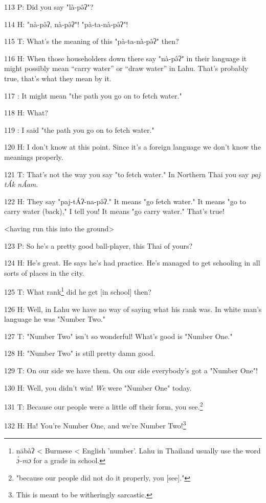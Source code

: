 113 P: Did you say "là-pə̂ʔ"?

114 H: "nà-pə̂ʔ, nà-pə̂ʔ"! "pà-ta-nà-pə̂ʔ"!

115 T: What's the meaning of this "pà-ta-nà-pə̂ʔ" then?

116 H: When those householders down there say "nà-pə̂ʔ" in
their language it might possibly mean ``carry water'' or ``draw water'' in Lahu.
That's probably true, that's what they mean by it.

117    : It might mean "the path you go on to fetch water."

118 H: What?

119    : I said "the path you go on to fetch water."

120 H: I don't know at this point. Since it's a foreign language we don't know
the meanings properly.

121 T: That's not the way you say "to fetch water." In Northern
Thai you say \textit{paj tÁk nÁam}.

122 H: They say "paj-tÁʔ-na-pə̂ʔ." It means "go
fetch water." It means "go to carry water (back)," I
tell you! It means "go carry water." That's true!

<having run this into the ground>

123 P: So he's a pretty good ball-player, this Thai of yours?

124 H: He's great. He says he's had practice. He's managed to get schooling in
all sorts of places in the city.

125 T: What rank\footnote{nābàʔ < Burmese < English 'number'. Lahu in Thailand usually use the word \textit{ɔ̀-mɔ} for a grade in school.} did he get [in school] then?

126 H: Well, in Lahu we have no way of saying what his rank was. In white man's
language he was "Number Two."

127 T: "Number Two" isn't so wonderful! What's good is "Number
One."

128 H: "Number Two" is still pretty damn good.

129 T: On our side we have them. On our side everybody's got a "Number
One"!

130 H: Well, you didn't win! \textit{We} were "Number One" today.

131 T: Because our people were a little off their form, you see.\footnote{"because our people did not do it properly, you [see]."}

132 H: Ha! You're Number One, and we're Number Two!\footnote{This is meant to be witheringly sarcastic.}

